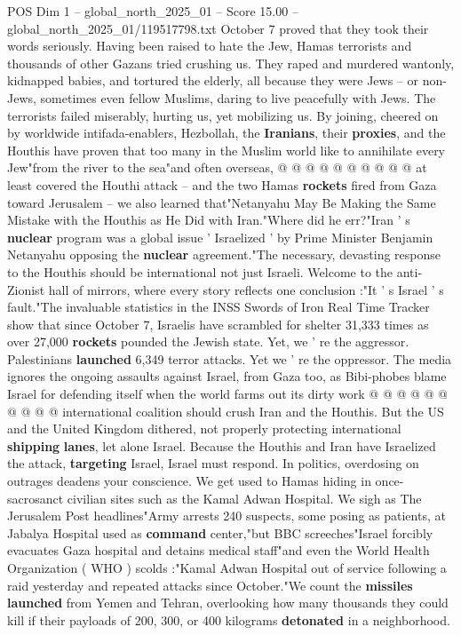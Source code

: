 \begin{textsample}{POS Dim 1 – global\_north\_2025\_01 – Score 15.00 – global\_north\_2025\_01/119517798.txt}
October 7 proved that they took their words seriously.
Having been raised to hate the Jew, Hamas terrorists and thousands of other Gazans tried crushing us.
They raped and murdered wantonly, kidnapped babies, and tortured the elderly, all because they were Jews -- or non-Jews, sometimes even fellow Muslims, daring to live peacefully with Jews.
The terrorists failed miserably, hurting us, yet mobilizing us.
By joining, cheered on by worldwide intifada-enablers, Hezbollah, the \textbf{Iranians}, their \textbf{proxies}, and the Houthis have proven that too many in the Muslim world like to annihilate every Jew"from the river to the sea"and often overseas, @ @ @ @ @ @ @ @ @ @ at least covered the Houthi attack -- and the two Hamas \textbf{rockets} fired from Gaza toward Jerusalem -- we also learned that"Netanyahu May Be Making the Same Mistake with the Houthis as He Did with Iran."Where did he err?"Iran ' s \textbf{nuclear} program was a global issue ' Israelized ' by Prime Minister Benjamin Netanyahu opposing the \textbf{nuclear} agreement."The necessary, devasting response to the Houthis should be international not just Israeli.
Welcome to the anti-Zionist hall of mirrors, where every story reflects one conclusion :"It ' s Israel ' s fault."The invaluable statistics in the INSS Swords of Iron Real Time Tracker show that since October 7, Israelis have scrambled for shelter 31,333 times as over 27,000 \textbf{rockets} pounded the Jewish state.
Yet, we ' re the aggressor.
Palestinians \textbf{launched} 6,349 terror attacks.
Yet we ' re the oppressor.
The media ignores the ongoing assaults against Israel, from Gaza too, as Bibi-phobes blame Israel for defending itself when the world farms out its dirty work @ @ @ @ @ @ @ @ @ @ international coalition should crush Iran and the Houthis.
But the US and the United Kingdom dithered, not properly protecting international \textbf{shipping} \textbf{lanes}, let alone Israel.
Because the Houthis and Iran have Israelized the attack, \textbf{targeting} Israel, Israel must respond.
In politics, overdosing on outrages deadens your conscience.
We get used to Hamas hiding in once-sacrosanct civilian sites such as the Kamal Adwan Hospital.
We sigh as The Jerusalem Post headlines"Army arrests 240 suspects, some posing as patients, at Jabalya Hospital used as \textbf{command} center,"but BBC screeches"Israel forcibly evacuates Gaza hospital and detains medical staff"and even the World Health Organization ( WHO ) scolds :"Kamal Adwan Hospital out of service following a raid yesterday and repeated attacks since October."We count the \textbf{missiles} \textbf{launched} from Yemen and Tehran, overlooking how many thousands they could kill if their payloads of 200, 300, or 400 kilograms \textbf{detonated} in a neighborhood.

\end{textsample}
